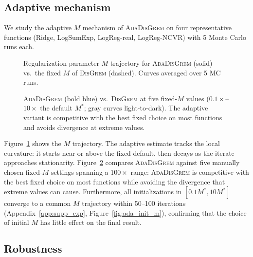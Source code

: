 \documentclass[review,onefignum,onetabnum]{siamart171218}
\begin{document}
	\FloatBarrier
	\subsection{Adaptive mechanism}\label{ssec:ada}
	
	We study the adaptive $M$ mechanism of \textsc{AdaDisGrem} on four
	representative functions (Ridge, LogSumExp, LogReg-real, LogReg-NCVR)
	with 5 Monte Carlo runs each.
	
	\begin{figure}[htbp]
		\centering
		\caption{Regularization parameter $M$ trajectory for \textsc{AdaDisGrem}
			(solid) vs.\ the fixed $M$ of \textsc{DisGrem} (dashed).
			Curves averaged over 5 MC runs.}
		\label{fig:ada_trajectory}
	\end{figure}
	
	\begin{figure}[htbp]
		\centering
		\caption{\textsc{AdaDisGrem} (bold blue) vs.\ \textsc{DisGrem}
			at five fixed-$M$ values
			($0.1\times$--$10\times$ the default $M^*$; gray curves
			light-to-dark).
			The adaptive variant is competitive with the best fixed
			choice on most functions and avoids divergence at extreme values.}
		\label{fig:ada_vs_fixed}
	\end{figure}
	
	Figure~\ref{fig:ada_trajectory} shows the $M$ trajectory.
	The adaptive estimate tracks the local curvature: it starts near
	or above the fixed default, then decays as the iterate approaches
	stationarity.
	Figure~\ref{fig:ada_vs_fixed} compares \textsc{AdaDisGrem} against
	five manually chosen fixed-$M$ settings spanning a $100\times$ range:
	\textsc{AdaDisGrem} is competitive with the best fixed choice on
	most functions while avoiding the divergence that extreme values
	can cause.
	Furthermore, all initializations in $[0.1M^*,10M^*]$
	converge to a common $M$ trajectory within 50--100 iterations
	(Appendix~\ref{app:supp_exp}, Figure~\ref{fig:ada_init_m}),
	confirming that the choice of initial $M$ has little effect
	on the final result.
	
	\FloatBarrier
	\subsection{Robustness}\label{ssec:robust}
	
\end{document}

